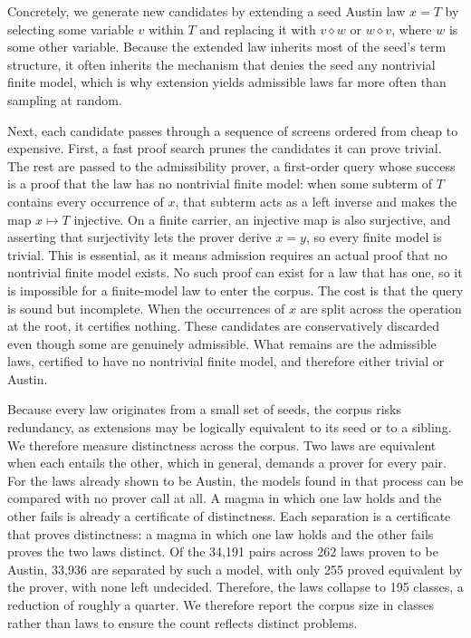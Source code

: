 \documentclass[letterpaper]{article} %
\newcommand{\op}{\diamond}
\begin{document}
Concretely, we generate new candidates by extending a seed Austin law $x = T$ by selecting some variable $v$ within $T$ and replacing it with $v \op w$ or $w \op v$, where $w$ is some other variable. Because the extended law inherits most of the seed's term structure, it often inherits the mechanism that denies the seed any nontrivial finite model, which is why extension yields admissible laws far more often than sampling at random. 

Next, each candidate passes through a sequence of screens ordered from cheap to expensive. First, a fast proof search prunes the candidates it can prove trivial. The rest are passed to the admissibility prover, a first-order query whose success is a proof that the law has no nontrivial finite model: when some subterm of $T$ contains every occurrence of $x$, that subterm acts as a left inverse and makes the map $x \mapsto T$ injective. On a finite carrier, an injective map is also surjective, and asserting that surjectivity lets the prover derive $x = y$, so every finite model is trivial. This is essential, as it means admission requires an actual proof that no nontrivial finite model exists. No such proof can exist for a law that has one, so it is impossible for a finite-model law to enter the corpus. The cost is that the query is sound but incomplete. When the occurrences of $x$ are split across the operation at the root, it certifies nothing. These candidates are conservatively discarded even though some are genuinely admissible. What remains are the admissible laws, certified to have no nontrivial finite model, and therefore either trivial or Austin.


Because every law originates from a small set of seeds, the corpus risks redundancy, as extensions may be logically equivalent to its seed or to a sibling. We therefore measure distinctness across the corpus. Two laws are equivalent when each entails the other, which in general, demands a prover for every pair. For the laws already shown to be Austin, the models found in that process can be compared with no prover call at all. A magma in which one law holds and the other fails is already a certificate of distinctness. Each separation is a certificate that proves distinctness: a magma in which one law holds and the other fails proves the two laws distinct. Of the 34,191 pairs across 262 laws proven to be Austin, 33,936 are separated by such a model, with only 255 proved equivalent by the prover, with none left undecided. Therefore, the laws collapse to 195 classes, a reduction of roughly a quarter. We therefore report the corpus size in classes rather than laws to ensure the count reflects distinct problems.
\end{document}
